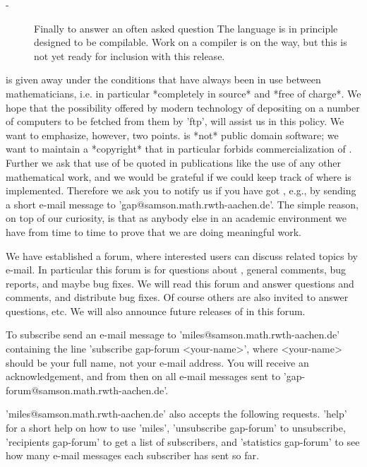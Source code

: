 \begin{description}
\item[-]
 
Finally to answer  an often asked  question{\:} The {\GAP} language is in
principle designed to  be compilable.  Work on a  compiler is on the way,
but this is not yet ready for inclusion with this release.

\end{description}

{\GAP} is given  away under the  conditions that have always  been in use
between  mathematicians, i.e.  in particular *completely  in source*  and
*free  of  charge*.  We  hope  that  the  possibility  offered  by modern
technology of  depositing {\GAP} on a number of  computers  to be fetched
from them by 'ftp', will assist us in this policy.  We want to emphasize,
however, two points.  {\GAP} is  *not* public domain software; we want to
maintain  a *copyright* that  in particular forbids  commercialization of
{\GAP}.  Further we ask that use of {\GAP} be quoted in publications like
the use of any  other mathematical work, and  we would be grateful if  we
could keep track of where {\GAP} is implemented.  Therefore we ask you to
notify us if you have got {\GAP}, e.g., by sending a short e-mail message
to  'gap@samson.math.rwth-aachen.de'.   The simple reason,  on top of our
curiosity, is that  as anybody  else in  an academic  environment we have
from time to time to prove that we are doing meaningful work.

We  have established a {\GAP} forum, where interested  users  can discuss
{\GAP}  related  topics  by  e-mail.  In particular  this  forum  is  for
questions about  {\GAP}, general  comments, bug  reports,  and  maybe bug
fixes.   We will read this forum and answer questions  and  comments, and
distribute  bug  fixes.  Of course  others  are  also  invited to  answer
questions, etc.  We will  also announce future releases of {\GAP} in this
forum.

To subscribe send an e-mail message to 'miles@samson.math.rwth-aachen.de'
containing the line 'subscribe  gap-forum <your-name>', where <your-name>
should be your  full name, not your  e-mail address.  You will receive an
acknowledgement, and from      then  on all  e-mail   messages    sent to
'gap-forum@samson.math.rwth-aachen.de'.

'miles@samson.math.rwth-aachen.de'     also    accepts   the    following
requests. 'help'  for a short  help on how  to use  'miles', 'unsubscribe
gap-forum'  to  unsubscribe, 'recipients  gap-forum'  to  get  a list  of
subscribers, and  'statistics gap-forum' to  see how many e-mail messages
each subscriber has sent so far.

